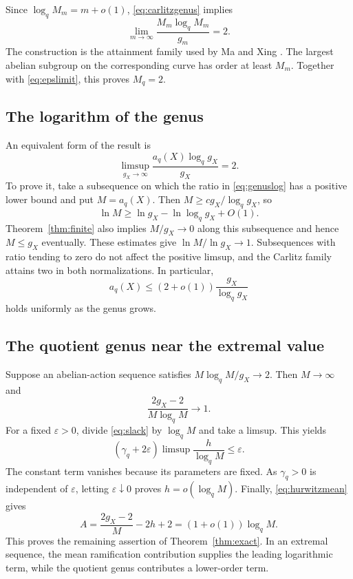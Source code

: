 \documentclass[12pt,onecolumn,draftclsnofoot,letterpaper]{IEEEtran}
\theoremstyle{remark}
\begin{document}
Since $\log_q M_m=m+o(1)$, \eqref{eq:carlitzgenus} implies
\begin{equation}
 \lim_{m\to\infty}\frac{M_m\log_qM_m}{g_m}=2.
 \label{eq:carlitzlimit}
\end{equation}
The construction is the attainment family used by Ma and Xing \cite[Ex.~1]{maxing}. The largest abelian subgroup on the corresponding curve has order at least $M_m$. Together with \eqref{eq:epslimit}, this proves $M_q=2$.

\subsection{The logarithm of the genus}
An equivalent form of the result is
\begin{equation}
 \limsup_{g_X\to\infty}
 \frac{a_q(X)\log_qg_X}{g_X}=2.
 \label{eq:genuslog}
\end{equation}
To prove it, take a subsequence on which the ratio in \eqref{eq:genuslog} has a positive lower bound and put $M=a_q(X)$. Then $M\ge c g_X/\log_qg_X$, so
\[
 \ln M\ge\ln g_X-\ln\log_qg_X+O(1).
\]
Theorem~\ref{thm:finite} also implies $M/g_X\to0$ along this subsequence and hence $M\le g_X$ eventually. These estimates give $\ln M/\ln g_X\to1$. Subsequences with ratio tending to zero do not affect the positive limsup, and the Carlitz family attains two in both normalizations. In particular,
\begin{equation}
 a_q(X)\le(2+o(1))\frac{g_X}{\log_qg_X}
 \label{eq:orderform}
\end{equation}
holds uniformly as the genus grows.

\subsection{The quotient genus near the extremal value}
Suppose an abelian-action sequence satisfies
$M\log_qM/g_X\to2$. Then $M\to\infty$ and
\[
 \frac{2g_X-2}{M\log_qM}\longrightarrow1.
\]
For a fixed $\varepsilon>0$, divide \eqref{eq:slack} by $\log_qM$ and take a limsup. This yields
\begin{equation}
 (\gamma_q+2\varepsilon)
 \limsup\frac h{\log_qM}\le\varepsilon.
 \label{eq:nearlimit}
\end{equation}
The constant term vanishes because its parameters are fixed. As $\gamma_q>0$ is independent of $\varepsilon$, letting $\varepsilon\downarrow0$ proves $h=o(\log_qM)$. Finally, \eqref{eq:hurwitzmean} gives
\begin{equation}
 A=\frac{2g_X-2}{M}-2h+2
   =(1+o(1))\log_qM.
 \label{eq:nearA}
\end{equation}
This proves the remaining assertion of Theorem~\ref{thm:exact}. In an extremal sequence, the mean ramification contribution supplies the leading logarithmic term, while the quotient genus contributes a lower-order term.
\end{document}
